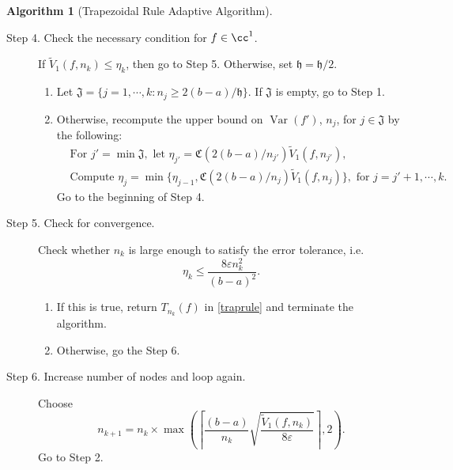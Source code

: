 \documentclass[draft]{iitthesis}
\DeclareMathOperator{\Var}{Var}
\theoremstyle{definition}
\newtheorem{algo}{Algorithm}
\theoremstyle{remark}
\begin{document}
\begin{algo}[Trapezoidal Rule Adaptive Algorithm]
\begin{description}
\item[Step 4. Check the necessary condition for $f \in \cc^1$.] If $\widetilde{V}_1(f,n_k) \le \eta_{k}$, then go to Step 5.
  Otherwise, set $\mathfrak{h} = \mathfrak{h}/2$.
    \begin{enumerate}[label=\alph*)]
      \item Let $\mathfrak{J}=\{j=1, \cdots, k: n_{j}\ge 2(b-a)/\mathfrak{h}\}$. If $\mathfrak{J}$ is empty, go to Step 1.
      \item Otherwise, recompute the upper bound on $\Var(f')$, $n_{j}$, for $j \in \mathfrak{J}$ by the following: 
      \begin{align*}
        &\text{For } j'=\min\mathfrak{J}, \text{ let } \eta_{j'}=\mathfrak{C}(2(b-a)/n_{j'})\widetilde{V}_1(f,n_{j'}), \\
        &\text{Compute } \eta_{j}=\min\{\eta_{j-1},\mathfrak{C}(2(b-a)/n_{j})\widetilde{V}_1(f,n_{j})\}, \text{ for } j=j'+1, \cdots, k.
      \end{align*}
        Go to the beginning of Step 4.
    \end{enumerate}


\item[Step 5. Check for convergence.] Check whether $n_k$ is large enough to satisfy the error tolerance, i.e.
    \begin{equation*}
        \eta_{k} \le \frac{8\varepsilon n_k^2}{(b-a)^2}.
    \end{equation*}

    \begin{enumerate}[label=\alph*)]
      \item If this is true, return $T_{n_k}(f)$ in \eqref{traprule} and terminate the algorithm.
      \item Otherwise, go the Step 6.
    \end{enumerate}


\item[Step 6. Increase number of nodes and loop again.] Choose
$$
n_{k+1}=n_k\times\max\left(\left\lceil\frac{(b-a)}{n_{k}}\sqrt{\frac{\widetilde{V}_1(f,n_k)}{8\varepsilon}}\right\rceil,2\right).
$$
Go to Step 2.
\end{description}
\end{algo}
\end{document}
